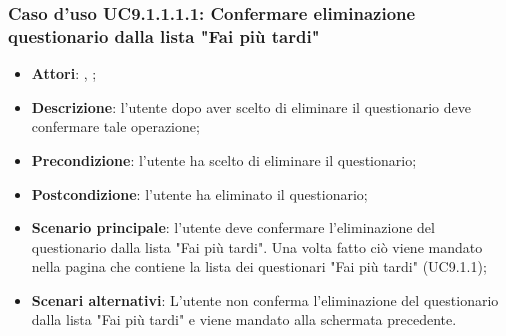 					\subsubsection{Caso d'uso UC9.1.1.1.1: Confermare eliminazione questionario dalla lista "Fai più tardi"}
					\label{UC9.1.1.1.1}
					\begin{itemize}
						\item \textbf{Attori}: \uau, \uaupro;
						\item \textbf{Descrizione}: l'utente dopo aver scelto di eliminare il questionario deve confermare tale operazione;
						\item \textbf{Precondizione}: l'utente ha scelto di eliminare il questionario;
						\item \textbf{Postcondizione}: l'utente ha eliminato il questionario;
						\item \textbf{Scenario principale}: l'utente deve confermare l'eliminazione del questionario dalla lista "Fai più tardi". Una volta fatto ciò viene mandato nella pagina che contiene la lista dei questionari "Fai più tardi" (UC9.1.1);
						\item \textbf{Scenari alternativi}: L'utente non conferma l'eliminazione del questionario dalla lista "Fai più tardi" e viene mandato alla schermata precedente.
					\end{itemize}
							
